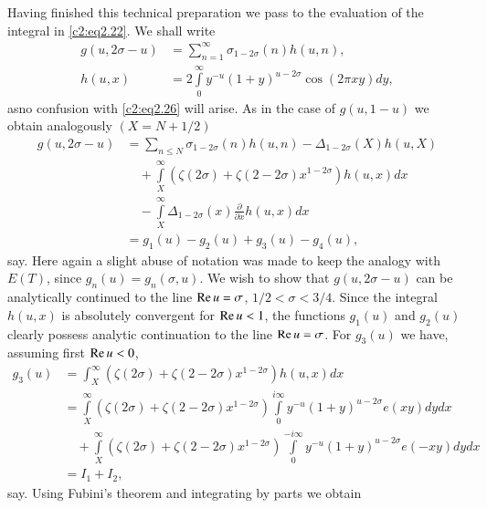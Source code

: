 Having finished this technical preparation we pass to the evaluation of
the integral in \eqref{c2:eq2.22}. We shall write
\begin{align*}
  g(u, 2 \sigma - u) & = \sum_{n=1}^\infty \sigma_{1- 2 \sigma} (n) h
  (u, n),\\
  h(u, x) & = 2 \int\limits_{0}^\infty y^{-u} (1+ y)^{u- 2 \sigma}
  \cos (2 \pi  xy) dy,
\end{align*}
as\pageoriginale no confusion with \eqref{c2:eq2.26} will arise. As in
the case of $g(u, 1- u)$ we obtain analogously $(X= N + 1/2)$
\begin{align*}
  g(u, 2 \sigma -u) &= \sum_{n \leq N} \sigma_{1- 2 \sigma} (n) h(u, n)
  - \Delta _{1- 2\sigma} (X) h(u, X)\\
 &\quad + \int\limits_X^\infty (\zeta (2 \sigma)+ \zeta (2- 2\sigma) x^{1- 2
  \sigma}) h(u, x) dx\\
&\quad - \int\limits_X^\infty \Delta _{1- 2 \sigma}
  (x) \frac{\partial}{\partial x} h(u, x)dx\\
 & = g_1 (u) - g_2 (u) + g_3(u) - g_4(u),
\end{align*}
say. Here again a slight abuse of notation was made to keep the
analogy with $E(T)$, since $g_n (u) = g_n (\sigma, u)$. We wish to
show that $g(u, 2 \sigma -u)$ can be analytically continued to the
line $\operatorname{Re} u = \sigma$, $1/2 < \sigma < 3/4$. Since the integral $h(u,
x)$ is absolutely convergent for $\operatorname{Re} u < 1$, the functions $g_1 (u)$
and $g_2 (u)$ clearly possess analytic continuation to the line $\operatorname{Re} u
= \sigma$. For $g_3 (u)$ we have, assuming first $\operatorname{Re} u < 0$,
\begin{align*}
  g_3 (u) & = \int_X^\infty (\zeta (2 \sigma) + \zeta (2- 2 \sigma)
  x^{1- 2 \sigma}) h (u, x)dx\\
  & = \int\limits_{X}^\infty (\zeta (2 \sigma)+ \zeta (2- 2
  \sigma)x^{1- 2 \sigma}) \int\limits_0^{i \infty} y^{-u} (1+ y)^{u- 2
  \sigma} e (xy) dy dx\\
  & \quad + \int\limits^\infty_{X} (\zeta (2 \sigma) + \zeta (2 - 2 \sigma)
  x^{1 - 2 \sigma})\int\limits^{- i \infty}_0 y^{-u} (1+y)^{u- 2
      \sigma} e(- xy) dy dx\\
    & = I_1 + I_2,
\end{align*}
say. Using Fubini's theorem and integrating by parts we obtain
